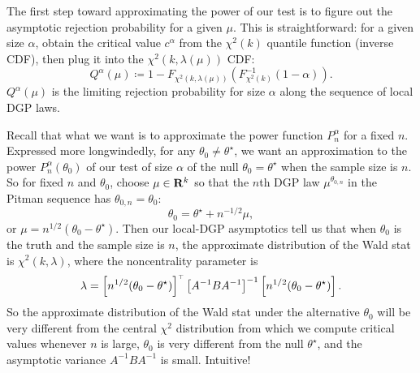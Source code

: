 \documentclass[11pt,letterpaper,reqno,oneside]{article}
\begin{document}
The first step toward approximating the power of our test is to figure out the asymptotic rejection probability for a given $\mu$. This is straightforward: for a given size $\alpha$, obtain the critical value $c^\alpha$ from the $\chi^2(k)$ quantile function (inverse CDF), then plug it into the $\chi^2(k,\lambda(\mu))$ CDF:
%
\begin{equation*}
	Q^\alpha(\mu) \coloneqq
	1 - F_{\chi^2(k,\lambda(\mu))}
	\left( F_{\chi^2(k)}^{-1}(1-\alpha) \right) .
\end{equation*}
%
$Q^\alpha(\mu)$ is the limiting rejection probability for size $\alpha$ along the sequence of local DGP laws.

Recall that what we want is to approximate the power function $P_n^\alpha$ for a fixed $n$. Expressed more longwindedly, for any $\theta_0 \neq \theta^\star$, we want an approximation to the power $P_n^\alpha(\theta_0)$ of our test of size $\alpha$ of the null $\theta_0=\theta^\star$ when the sample size is $n$. So for fixed $n$ and $\theta_0$, choose $\mu \in \mathbf{R}^k$ so that the $n$th DGP law $\mu^{\theta_{0,n}}$ in the Pitman sequence has $\theta_{0,n}=\theta_0$:
%
\begin{equation*}
	\theta_0 = \theta^\star + n^{-1/2} \mu ,
\end{equation*}
%
or $\mu = n^{1/2}(\theta_0-\theta^\star)$. Then our local-DGP asymptotics tell us that when $\theta_0$ is the truth and the sample size is $n$, the approximate distribution of the Wald stat is $\chi^2\left( k, \lambda \right)$, where the noncentrality parameter is
%
\begin{equation*}
	\lambda
	= \left[ n^{1/2}(\theta_0-\theta^\star) \right]^{\scriptscriptstyle \top} 
	\left[ A^{-1} B A^{-1} \right]^{-1} 
	\left[ n^{1/2}(\theta_0-\theta^\star) \right] .
\end{equation*}
%
So the approximate distribution of the Wald stat under the alternative $\theta_0$ will be very different from the central $\chi^2$ distribution from which we compute critical values whenever $n$ is large, $\theta_0$ is very different from the null $\theta^\star$, and the asymptotic variance $A^{-1} B A^{-1}$ is small. Intuitive!
\end{document}
